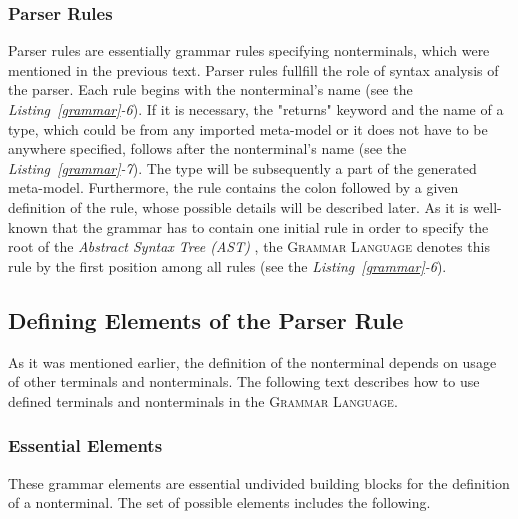 \documentclass[12pt,notitlepage,a4paper]{report}
\begin{document}
\subsubsection{Parser Rules} \label{parserRules}
Parser rules are essentially grammar rules specifying nonterminals, which were mentioned in the previous text. Parser rules fullfill the role of syntax analysis of the parser. Each rule begins with the nonterminal's name (see the \textit{Listing~\ref{grammar}-6}). If it is necessary, the "returns" keyword and the name of a type, which could be from any imported meta-model or it does not have to be anywhere specified, follows after the nonterminal's name (see the \textit{Listing~\ref{grammar}-7}). The type will be subsequently a part of the generated meta-model. Furthermore, the rule contains the colon followed by a given definition of the rule, whose possible details will be described later. As it is well-known that the grammar has to contain one initial rule in order to specify the root of the \textit{Abstract Syntax Tree (AST)} \cite{AST}, the \textsc{Grammar Language} denotes this rule by the first position among all rules (see the \textit{Listing~\ref{grammar}-6}). 

\subsection{Defining Elements of the Parser Rule} \label{grammarElements}

As it was mentioned earlier, the definition of the nonterminal depends on usage of other terminals and nonterminals. The following text describes how to use defined terminals and nonterminals in the \textsc{Grammar Language}. 

\subsubsection{Essential Elements}

These grammar elements are essential undivided building blocks for the definition of a nonterminal. The set of possible elements includes the following.
\end{document}
